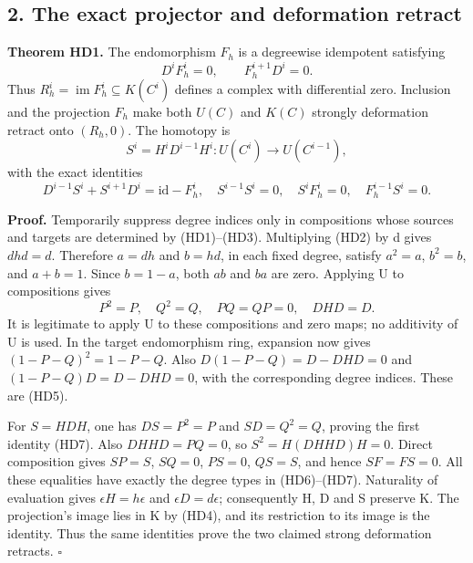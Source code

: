 \documentclass[
]{article}
\begin{document}
\subsection{2. The exact projector and deformation
retract}\label{the-exact-projector-and-deformation-retract}

\textbf{Theorem HD1.} The endomorphism \(F_h\) is a degreewise
idempotent satisfying \[
D^iF_h^i=0,\qquad F_h^{i+1}D^i=0.
\tag{HD5}
\] Thus \(R_h^i=\operatorname{im}F_h^i\subseteq K(C^i)\) defines a
complex with differential zero. Inclusion and the projection \(F_h\)
make both \(U(C)\) and \(K(C)\) strongly deformation retract onto
\((R_h,0)\). The homotopy is \[
S^i=H^iD^{i-1}H^i:U(C^i)\to U(C^{i-1}),
\tag{HD6}
\] with the exact identities \[
D^{i-1}S^i+S^{i+1}D^i=\mathrm{id}-F_h^i,
\quad S^{i-1}S^i=0,\quad S^iF_h^i=0,\quad F_h^{i-1}S^i=0.
\tag{HD7}
\]

\textbf{Proof.} Temporarily suppress degree indices only in compositions
whose sources and targets are determined by (HD1)--(HD3). Multiplying
(HD2) by d gives \(dhd=d\). Therefore \(a=dh\) and \(b=hd\), in each
fixed degree, satisfy \(a^2=a\), \(b^2=b\), and \(a+b=1\). Since
\(b=1-a\), both \(ab\) and \(ba\) are zero. Applying U to compositions
gives \[
P^2=P,\quad Q^2=Q,\quad PQ=QP=0,\quad DHD=D.
\tag{HD8}
\] It is legitimate to apply U to these compositions and zero maps; no
additivity of U is used. In the target endomorphism ring, expansion now
gives \((1-P-Q)^2=1-P-Q\). Also \(D(1-P-Q)=D-DHD=0\) and
\((1-P-Q)D=D-DHD=0\), with the corresponding degree indices. These are
(HD5).

For \(S=HDH\), one has \(DS=P^2=P\) and \(SD=Q^2=Q\), proving the first
identity (HD7). Also \(DHH D=PQ=0\), so \(S^2=H(DHH D)H=0\). Direct
composition gives \(SP=S\), \(SQ=0\), \(PS=0\), \(QS=S\), and hence
\(SF=FS=0\). All these equalities have exactly the degree types in
(HD6)--(HD7). Naturality of evaluation gives \(\epsilon H=h\epsilon\)
and \(\epsilon D=d\epsilon\); consequently H, D and S preserve K. The
projection's image lies in K by (HD4), and its restriction to its image
is the identity. Thus the same identities prove the two claimed strong
deformation retracts. \(\square\)
\end{document}
